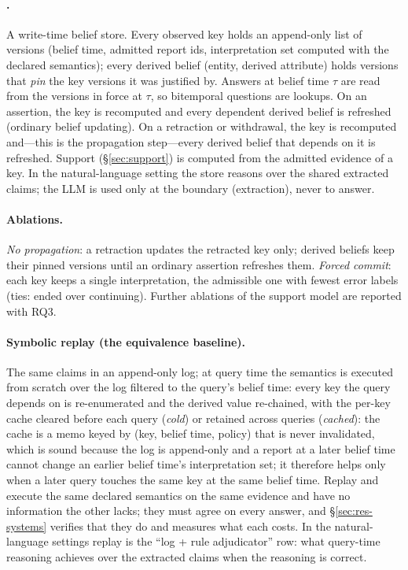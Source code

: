\paragraph{\pal.} A write-time belief store. Every observed key holds an append-only list of versions (belief time, admitted report ids, interpretation set computed with the declared semantics); every derived belief (entity, derived attribute) holds versions that \emph{pin} the key versions it was justified by. Answers at belief time $\tau$ are read from the versions in force at $\tau$, so bitemporal questions are lookups. On an assertion, the key is recomputed and every dependent derived belief is refreshed (ordinary belief updating). On a retraction or withdrawal, the key is recomputed and---this is the propagation step---every derived belief that depends on it is refreshed. Support (\S\ref{sec:support}) is computed from the admitted evidence of a key. In the natural-language setting the store reasons over the shared extracted claims; the LLM is used only at the boundary (extraction), never to answer.

\paragraph{Ablations.} \emph{No propagation}: a retraction updates the retracted key only; derived beliefs keep their pinned versions until an ordinary assertion refreshes them. \emph{Forced commit}: each key keeps a single interpretation, the admissible one with fewest error labels (ties: ended over continuing). Further ablations of the support model are reported with RQ3.

\paragraph{Symbolic replay (the equivalence baseline).} The same claims in an append-only log; at query time the semantics is executed from scratch over the log filtered to the query's belief time: every key the query depends on is re-enumerated and the derived value re-chained, with the per-key cache cleared before each query (\emph{cold}) or retained across queries (\emph{cached}): the cache is a memo keyed by (key, belief time, policy) that is never invalidated, which is sound because the log is append-only and a report at a later belief time cannot change an earlier belief time's interpretation set; it therefore helps only when a later query touches the same key at the same belief time. Replay and \pal{} execute the same declared semantics on the same evidence and have no information the other lacks; they must agree on every answer, and \S\ref{sec:res-systems} verifies that they do and measures what each costs. In the natural-language settings replay is the ``log + rule adjudicator'' row: what query-time reasoning achieves over the extracted claims when the reasoning is correct.

